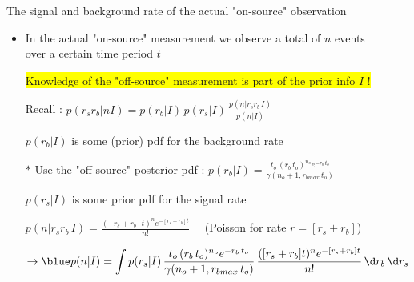 \Tr
\begin{center}
{\red The signal and background rate of the actual "on-source" observation} 
\end{center}
%
\begin{itemize}
\item In the actual "on-source" measurement we observe a total of $n$ events\\
      over a certain time period $t$
\item[] \colorbox{yellow}{Knowledge of the "off-source" measurement is part of the prior info $I$ !}
\item[] Recall :
        {\blue $\displaystyle p(r_{s}r_{b}|nI)=p(r_{b}|I)\,p(r_{s}|I)\,\frac{p(n|r_{s}r_{b}\,I)}{p(n|I)}$}
\item[] $p(r_{b}|I)$ is some (prior) pdf for the background rate
\item[$\ast$] {\red Use the "off-source" posterior pdf :}
              {\blue $\displaystyle p(r_{b}|I)=
               \frac{t_{o}\,(r_{b}\,t_{o})^{n_{o}} e^{-r_{b}\,t_{o}}}{\gamma(n_{o}+1,r_{bmax}\,t_{o})}$}
\item[] $p(r_{s}|I)$ is some prior pdf for the signal rate
\item[] {\blue $\displaystyle p(n|r_{s}r_{b}\,I)=\frac{([r_{s}+r_{b}] t)^{n} e^{-[r_{s}+r_{b}] t}}{n!} \quad$}
        (Poisson for rate $r=[r_{s}+r_{b}]$)
\item[] $\rightarrow {\blue \displaystyle p(n|I)=\int p(r_{s}|I)\,
                       \frac{t_{o}\,(r_{b}\,t_{o})^{n_{o}} e^{-r_{b}\,t_{o}}}{\gamma(n_{o}+1,r_{bmax}\,t_{o})}\,
                       \frac{([r_{s}+r_{b}] t)^{n} e^{-[r_{s}+r_{b}] t}}{n!}
                       \,\d r_{b}\,\d r_{s}}$
\end{itemize}

